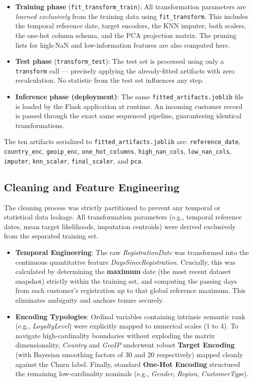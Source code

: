 \documentclass[11pt,a4paper]{article}
\begin{document}
\begin{itemize}
    \item \textbf{Training phase} (\texttt{fit\_transform\_train}): All transformation parameters are \textit{learned exclusively} from the training data using \texttt{fit\_transform}. This includes the temporal reference date, target encoders, the KNN imputer, both scalers, the one-hot column schema, and the PCA projection matrix. The pruning lists for high-NaN and low-information features are also computed here.
    \item \textbf{Test phase} (\texttt{transform\_test}): The test set is processed using only a \texttt{transform} call — precisely applying the already-fitted artifacts with zero recalculation. No statistic from the test set influences any step.
    \item \textbf{Inference phase (deployment)}: The same \texttt{fitted\_artifacts.joblib} file is loaded by the Flask application at runtime. An incoming customer record is passed through the exact same sequenced pipeline, guaranteeing identical transformations.
\end{itemize}

The ten artifacts serialized to \texttt{fitted\_artifacts.joblib} are: \texttt{reference\_date}, \texttt{country\_enc}, \texttt{geoip\_enc}, \texttt{one\_hot\_columns}, \texttt{high\_nan\_cols}, \texttt{low\_nan\_cols}, \texttt{imputer}, \texttt{knn\_scaler}, \texttt{final\_scaler}, and \texttt{pca}.

\subsection{Cleaning and Feature Engineering}
The cleaning process was strictly partitioned to prevent any temporal or statistical data leakage. All transformation parameters (e.g., temporal reference dates, mean target likelihoods, imputation centroids) were derived exclusively from the separated training set. 

\begin{itemize}
    \item \textbf{Temporal Engineering}: The raw \textit{RegistrationDate} was transformed into the continuous quantitative feature \textit{DaysSinceRegistration}. Crucially, this was calculated by determining the \textbf{maximum} date (the most recent dataset snapshot) strictly within the training set, and computing the passing days from each customer's registration up to that global reference maximum. This eliminates ambiguity and anchors tenure securely.
    \item \textbf{Encoding Typologies}: Ordinal variables containing intrinsic semantic rank (e.g., \textit{LoyaltyLevel}) were explicitly mapped to numerical scales (1 to 4). To navigate high-cardinality boundaries without exploding the matrix dimensionality, \textit{Country} and \textit{GeoIP} underwent robust \textbf{Target Encoding} (with Bayesian smoothing factors of 30 and 20 respectively) mapped cleanly against the Churn label. Finally, standard \textbf{One-Hot Encoding} structured the remaining low-cardinality nominals (e.g., \textit{Gender}, \textit{Region}, \textit{CustomerType}).
\end{itemize}
\end{document}
